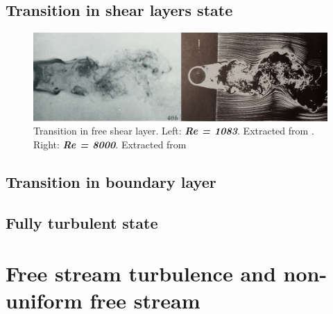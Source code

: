 \documentclass[journal]{new-aiaa}
\begin{document}
\subsection{Transition in shear layers state}

\begin{figure}[H]
\begin{center}
\includegraphics[width=1\textwidth]{Images/federico/Figure05}
\caption{Transition in free shear layer. Left: \textbf{\textit{Re = 1083}}. Extracted from \cite{Gerrard1978}. Right: \textbf{\textit{Re = 8000}}. Extracted from \cite{Zdravkovich1997}}
\label{fig:TrSL}
\end{center}
\end{figure}

\subsection{Transition in boundary layer}


\subsection{Fully turbulent state}








\section{Free stream turbulence and non-uniform free stream}










\end{document}
